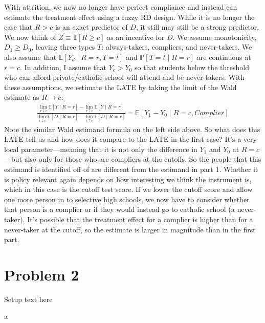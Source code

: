 \documentclass{article}
\begin{document}
\begin{solution}
With attrition, we now no longer have perfect compliance and instead can estimate the treatment effect using a fuzzy RD design. While it is no longer the case that $R>c$ is an exact predictor of $D$, it still may still be a strong predictor. We now think of $Z\equiv \mathbf{1}[R\geq c]$ as an incentive for $D$. We assume monotonicity, $D_1 \geq D_0$, leaving three types $T$: always-takers, compliers, and never-takers. We also assume that $\mathbb{E}\left[Y_{d} \mid R=r, T=t\right]$ and $\mathbb{P}[T=t \mid R=r]$ are continuous at $r=c$. In addition, I assume that $Y_c>Y_0$ so that students below the threshold who can afford private/catholic school will attend and be never-takers. With these assumptions, we estimate the LATE by taking the limit of the Wald estimate as $R \to c$:
\begin{align*}
    \frac{\lim _{r \downarrow c} \mathbb{E}[Y \mid R=r]-\lim _{r \uparrow c} \mathbb{E}[Y \mid R=r]}{\lim _{r \downarrow c} \mathbb{E}[D \mid R=r]-\lim _{r \uparrow c} \mathbb{E}[D \mid R=r]}=\mathbb{E}\left[Y_{1}-Y_{0} \mid R=c, Complier\right]
\end{align*}
Note the similar Wald estimand formula on the left side above. So what does this LATE tell us and how does it compare to the LATE in the first case? It's a very local parameter---meaning that it is not only the difference in $Y_1$ and $Y_0$ at $R=c$---but also only for those who are compliers at the cutoffs. So the people that this estimand is identified off of are different from the estimand in part 1. Whether it is policy relevant again depends on how interesting we think the instrument is, which in this case is the cutoff test score. If we lower the cutoff score and allow one more person in to selective high schools, we now have to consider whether that person is a complier or if they would instead go to catholic school (a never-taker). It's possible that the treatment effect for a complier is higher than for a never-taker at the cutoff, so the estimate is larger in magnitude than in the first part.

\end{solution}

\newpage
\section*{Problem 2}
Setup text here

\begin{problem}{a}
\end{problem}
\begin{solution}
\end{solution}
\end{document}
